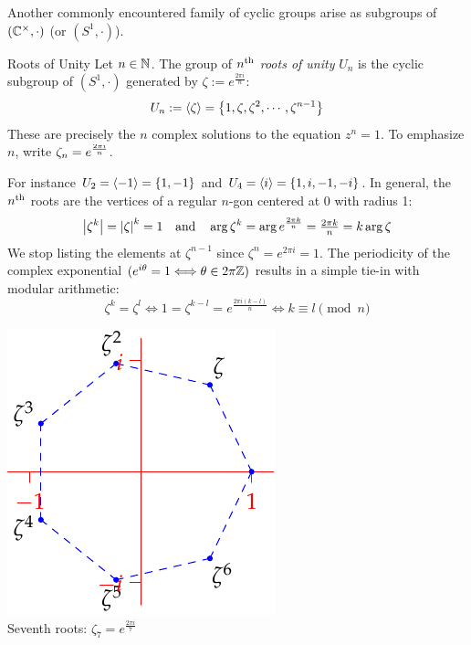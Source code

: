 
Another commonly encountered family of cyclic groups arise as subgroups of $(\mathbb{C}^\times,\cdot)$ (or $(S^1,\cdot)$).

\begin{defn}{Roots of Unity}{}
	Let $n\in\mathbb{N}$. The group of \emph{$n\textsuperscript{th}$ roots of unity} $U_n$ is the cyclic subgroup of $(S^1,\cdot)$ generated by $\zeta:=e^{\frac{2\pi i}n}$:
	\[
		U_n:=\left\langle \zeta\right\rangle=\bigl\{1,\zeta,\zeta^2,\cdots,\zeta^{n-1}\bigr\}
	\]
	These are precisely the $n$ complex solutions to the equation $z^n=1$. To emphasize $n$, write $\zeta_n=\smash[t]{e^{\frac{2\pi i}n}}$. 
\end{defn}

\begin{minipage}[t]{0.75\linewidth}\vspace{-5pt}
	For instance $U_2=\left\langle -1\right\rangle=\{1,-1\}$ and $U_4=\left\langle i\right\rangle=\{1,i,-1,-i\}$. In general, the $n\textsuperscript{th}$ roots are the vertices of a regular $n$-gon centered at 0 with radius 1:
	\[
		\left| \zeta^k\right|=\left| \zeta\right|^k=1
		\quad\text{and}\quad
		\arg\zeta^k=\arg e^{\frac{2\pi k}{n}}=\tfrac{2\pi k}n=k\arg\zeta
	\]
	We stop listing the elements at $\zeta^{n-1}$ since $\zeta^n=e^{2\pi i}=1$. The periodicity of the complex exponential $(e^{i\theta}=1\Longleftrightarrow \theta\in 2\pi\mathbb{Z})$ results in a simple tie-in with modular arithmetic:
	\[
		\zeta^k=\zeta^l\iff 1=\zeta^{k-l}=e^{\frac{2\pi i(k-l)}n}\iff k\equiv l\pmod n
	\]
\end{minipage}
\hfill
\begin{minipage}[t]{0.24\linewidth}\vspace{-5pt}
	\centering
	\includegraphics[scale=0.8]{cyclic-rootunity}\\
	Seventh roots: $\zeta_7=e^{\frac{2\pi i}7}$
\end{minipage}
\bigbreak

